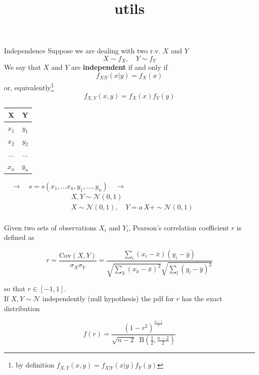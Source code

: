 \documentclass[a4paper, 10pt]{beamer}
\title{utils}
\author{}
\begin{document}
\begin{frame}{Independence}
  Suppose we are dealing with two r.v. $X$ and $Y$
  \begin{equation*}
    X \sim f_X, \quad Y \sim f_Y
  \end{equation*}
  We say that $X$ and $Y$ are \textbf{independent} if and only if
  \begin{equation*}
    f_{X|Y}(x|y) = f_X(x)
  \end{equation*}
  or, equivalently\footnote{by definition $f_{X,Y}(x,y) = f_{X|Y}(x|y) f_Y(y)$}
  \begin{equation*}
    f_{X,Y}(x,y) = f_X(x)f_Y(y)
  \end{equation*}
\end{frame}

\begin{frame}
  \begin{tabular}{c | c}
    X & Y \\
    \hline
    $x_1$ & $y_1$\\
    $x_2$ & $y_2$\\
    ... & ...\\
    $x_n$ & $y_n$\\
  \end{tabular}
  $\quad \longrightarrow \quad s = s(x_1,...x_n,y_1,...,y_n) \quad \longrightarrow$ 
  \begin{align}
    &X, Y \sim \mathcal{N}(0,1)\\[10pt]
    &X \sim \mathcal{N}(0,1), \quad Y = a\,X + \sim \mathcal{N}(0,1)\\[10pt]
  \end{align}
\end{frame}

\begin{frame}
  Given two sets of observations $X_i$ and $Y_i$, Pearson's correlation
  coefficient $r$ is defined as

  \begin{equation*}
    r = \frac{\text{Cov}(X,Y)}{\sigma_X \sigma_Y} = 
    \frac{\sum_{i}(x_i-\bar{x})(y_i-\bar{y})}{\sqrt{\sum_{k}(x_k-\bar{x})^2}\sqrt{\sum_{l}(y_l-\bar{y})^2}}
  \end{equation*}\vspace{10pt}

  so that $r \in [-1,1]$.\\
  If $X, Y \sim \mathcal{N}$ independently (null hypothesis) the pdf for $r$ 
  has the exact distribution

  \begin{equation*}
    f(r) = \frac{\left(1-r^2\right)^{\frac{n-1}{2}}}{\sqrt{n-2}
    \;\;\text{B}\left(\frac{1}{2},\frac{n-2}{2}\right)}
  \end{equation*}
\end{frame}
\end{document}
